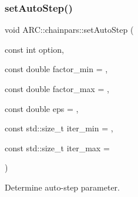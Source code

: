 \subsubsection{\texorpdfstring{set\+Auto\+Step()}{setAutoStep()}}
{\footnotesize\ttfamily void A\+R\+C\+::chainpars\+::set\+Auto\+Step (\begin{DoxyParamCaption}\item[{const int}]{option,  }\item[{const double}]{factor\+\_\+min = {},  }\item[{const double}]{factor\+\_\+max = {},  }\item[{const double}]{eps = {},  }\item[{const std\+::size\+\_\+t}]{iter\+\_\+min = {},  }\item[{const std\+::size\+\_\+t}]{iter\+\_\+max = {} }\end{DoxyParamCaption})\hspace{0.3cm}{\ttfamily [inline]}}



Determine auto-\/step parameter. 


